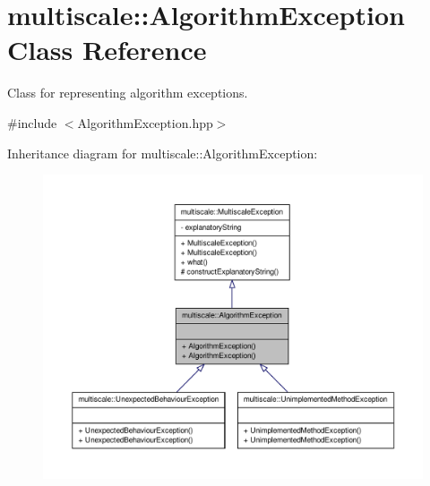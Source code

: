 \hypertarget{classmultiscale_1_1AlgorithmException}{\section{multiscale\-:\-:\-Algorithm\-Exception \-Class \-Reference}
\label{classmultiscale_1_1AlgorithmException}
}


\-Class for representing algorithm exceptions.  




{\ttfamily \#include $<$\-Algorithm\-Exception.\-hpp$>$}



\-Inheritance diagram for multiscale\-:\-:\-Algorithm\-Exception\-:\nopagebreak
\begin{figure}[H]
\begin{center}
\leavevmode
\includegraphics[width=350pt]{classmultiscale_1_1AlgorithmException__inherit__graph}
\end{center}
\end{figure}


